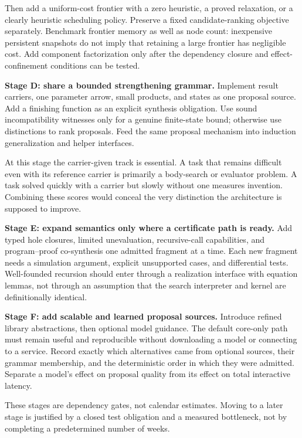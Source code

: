 Then add a uniform-cost frontier with a zero heuristic, a proved relaxation, or a clearly heuristic scheduling policy. Preserve a fixed candidate-ranking objective separately. Benchmark frontier memory as well as node count: inexpensive persistent snapshots do not imply that retaining a large frontier has negligible cost. Add component factorization only after the dependency closure and effect-confinement conditions can be tested.

\textbf{Stage D: share a bounded strengthening grammar.} Implement result carriers, one parameter arrow, small products, and  states as one proposal source. Add a finishing function as an explicit synthesis obligation. Use sound incompatibility witnesses only for a genuine finite-state bound; otherwise use distinctions to rank proposals. Feed the same proposal mechanism into induction generalization and helper interfaces.

At this stage the carrier-given track is essential. A task that remains difficult even with its reference carrier is primarily a body-search or evaluator problem. A task solved quickly with a carrier but slowly without one measures invention. Combining these scores would conceal the very distinction the architecture is supposed to improve.

\textbf{Stage E: expand semantics only where a certificate path is ready.} Add typed hole closures, limited unevaluation, recursive-call capabilities, and program--proof co-synthesis one admitted fragment at a time. Each new fragment needs a simulation argument, explicit unsupported cases, and differential tests. Well-founded recursion should enter through a realization interface with equation lemmas, not through an assumption that the search interpreter and kernel are definitionally identical.

\textbf{Stage F: add scalable and learned proposal sources.} Introduce refined library abstractions, then optional model guidance. The default core-only path must remain useful and reproducible without downloading a model or connecting to a service. Record exactly which alternatives came from optional sources, their grammar membership, and the deterministic order in which they were admitted. Separate a model's effect on proposal quality from its effect on total interactive latency.

These stages are dependency gates, not calendar estimates. Moving to a later stage is justified by a closed test obligation and a measured bottleneck, not by completing a predetermined number of weeks.

